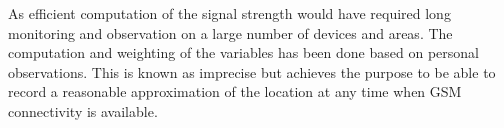 As efficient computation of the signal strength would have required long monitoring and observation on a large number of devices and areas.
The computation and weighting of the variables has been done based on personal observations.
This is known as imprecise but achieves the purpose to be able to record a reasonable approximation of the location at any time when GSM connectivity is available.\\

